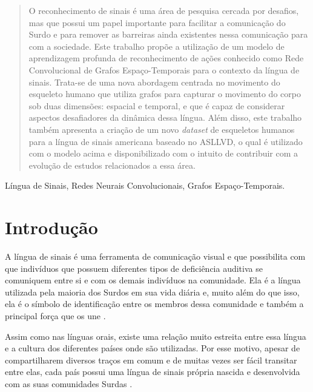 

\maketitle
\begin{abstract}
O reconhecimento de sinais é uma área de pesquisa cercada por desafios, mas que possui um papel importante para facilitar a comunicação do Surdo e para remover as barreiras ainda existentes nessa comunicação para com a sociedade. Este trabalho propõe a utilização de um modelo de aprendizagem profunda de reconhecimento de ações conhecido como Rede Convolucional de Grafos Espaço-Temporais para o contexto da língua de sinais. Trata-se de uma nova abordagem centrada no movimento do esqueleto humano que utiliza grafos para capturar o movimento do corpo sob duas dimensões: espacial e temporal, e que é capaz de considerar aspectos desafiadores da dinâmica dessa língua. Além disso, este trabalho também apresenta a criação de um novo \textit{dataset} de esqueletos humanos para a língua de sinais americana baseado no ASLLVD, o qual é utilizado com o modelo acima e disponibilizado com o intuito de contribuir com a evolução de estudos relacionados a essa área.
\end{abstract}

\begin{IEEEkeywords}
Língua de Sinais, Redes Neurais Convolucionais, Grafos Espaço-Temporais.
\end{IEEEkeywords}


\section{Introdução} %
\label{sec:introducao}

A língua de sinais é uma ferramenta de comunicação visual e que possibilita com que indivíduos que possuem diferentes tipos de deficiência auditiva se comuniquem entre si e com os demais indivíduos na comunidade. Ela é a língua utilizada pela maioria dos Surdos em sua vida diária e, muito além do que isso, ela é o símbolo de identificação entre os membros dessa comunidade e também a principal força que os une \cite{pereira-choi-2011}. 

Assim como nas línguas orais, existe uma relação muito estreita entre essa língua e a cultura dos diferentes países onde são utilizadas. Por esse motivo, apesar de compartilharem diversos traços em comum e de muitas vezes ser fácil transitar entre elas, cada país possui uma língua de sinais própria nascida e desenvolvida com as suas comunidades Surdas \cite{pereira-choi-2011}.

